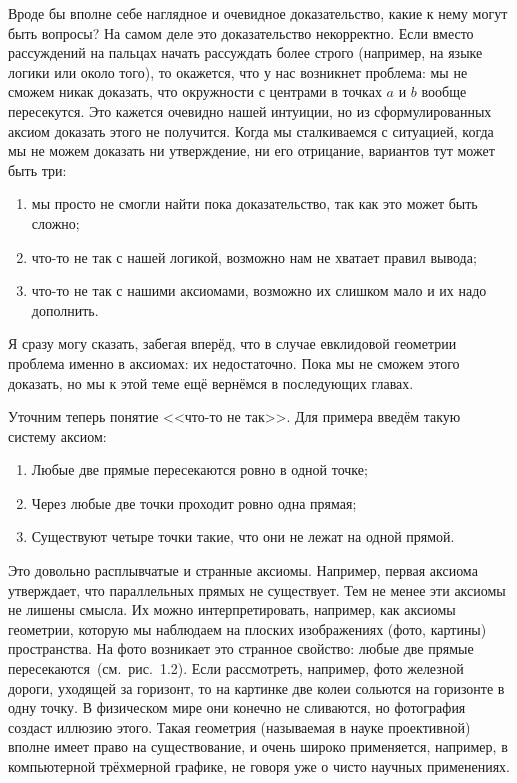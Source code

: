 Вроде бы вполне себе наглядное и очевидное доказательство, какие к нему могут быть вопросы? На самом деле это доказательство некорректно. Если вместо рассуждений на пальцах начать рассуждать более строго (например, на языке логики или около того), то окажется, что у нас возникнет проблема: мы не сможем никак доказать, что окружности с центрами в точках $a$ и $b$ вообще пересекутся. Это кажется очевидно нашей интуиции, но из сформулированных аксиом доказать этого не получится. Когда мы сталкиваемся с ситуацией, когда мы не можем доказать ни утверждение, ни его отрицание, вариантов тут может быть три:

\begin{enumerate}
\item мы просто не смогли найти пока доказательство, так как это может быть сложно;
\item что-то не так с нашей логикой, возможно нам не хватает правил вывода;
\item что-то не так с нашими аксиомами, возможно их слишком мало и их надо дополнить.
\end{enumerate}

Я сразу могу сказать, забегая вперёд, что в случае евклидовой геометрии проблема именно в аксиомах: их недостаточно. Пока мы не сможем этого доказать, но мы к этой теме ещё вернёмся в последующих главах.

Уточним теперь понятие <<что-то не так>>. Для примера введём такую систему аксиом:

\begin{enumerate}
\item Любые две прямые пересекаются ровно в одной точке;
\item Через любые две точки проходит ровно одна прямая;
\item Существуют четыре точки такие, что они не лежат на одной прямой.
\end{enumerate}

Это довольно расплывчатые и странные аксиомы. Например, первая аксиома утверждает, что параллельных прямых не существует. Тем не менее эти аксиомы не лишены смысла. Их можно интерпретировать, например, как аксиомы геометрии, которую мы наблюдаем на плоских изображениях (фото, картины) пространства. На фото возникает это странное свойство: любые две прямые пересекаются~(см.~рис.~1.2). Если рассмотреть, например, фото железной дороги, уходящей за горизонт, то на картинке две колеи сольются на горизонте в одну точку. В физическом мире они конечно не сливаются, но фотография создаст иллюзию этого. Такая геометрия (называемая в науке проективной) вполне имеет право на существование, и очень широко применяется, например, в компьютерной трёхмерной графике, не говоря уже о чисто научных применениях.

